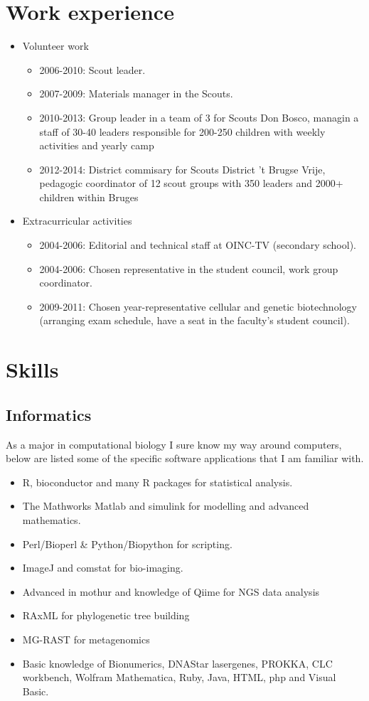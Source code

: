 \documentclass[a4paper,11pt,oneside]{article}
\begin{document}
\section*{Work experience}
\begin{itemize}
\item Volunteer work
	\begin{itemize}
	\item 2006-2010: Scout leader.
	\item 2007-2009: Materials manager in the Scouts.
  \item 2010-2013: Group leader in a team of 3 for Scouts Don Bosco, managin a staff of 30-40 leaders responsible for 200-250 children with weekly activities and yearly camp
  \item 2012-2014: District commisary for Scouts District 't Brugse Vrije, pedagogic coordinator of 12 scout groups with 350 leaders and 2000+ children within Bruges
	\end{itemize}
\item Extracurricular activities
	\begin{itemize}
	\item 2004-2006: Editorial and technical staff at OINC-TV (secondary school). 
	\item 2004-2006: Chosen representative in the student council, work group coordinator.
	\item 2009-2011: Chosen year-representative cellular and genetic biotechnology (arranging exam schedule, have a seat in the faculty's student council).
	\end{itemize}
\end{itemize}

\section*{Skills}
\subsection*{Informatics}
As a major in computational biology I sure know my way around computers, below are listed some of the specific software applications that I am familiar with.
\begin{itemize}
	\item R, bioconductor and many R packages for statistical analysis.
	\item The Mathworks Matlab and simulink for modelling and advanced mathematics.
	\item Perl/Bioperl \& Python/Biopython for scripting.
	\item ImageJ and comstat for bio-imaging.
  \item Advanced in mothur and knowledge of Qiime for NGS data analysis
  \item RAxML for phylogenetic tree building
  \item MG-RAST for metagenomics
	\item Basic knowledge of Bionumerics, DNAStar lasergenes, PROKKA, CLC workbench, Wolfram Mathematica,  Ruby, Java, HTML, php and Visual Basic.
\end{itemize}
\end{document}
